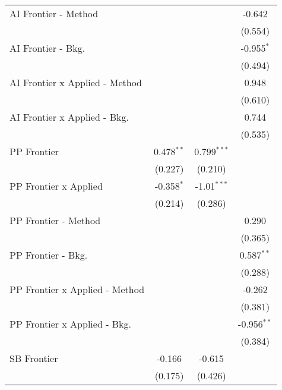\begin{tabular}{lccc}
   AI Frontier - Method           &               &               & -0.642\\   
                                  &               &               & (0.554)\\   
   AI Frontier - Bkg.             &               &               & -0.955$^{*}$\\   
                                  &               &               & (0.494)\\   
   AI Frontier x Applied - Method &               &               & 0.948\\   
                                  &               &               & (0.610)\\   
   AI Frontier x Applied - Bkg.   &               &               & 0.744\\   
                                  &               &               & (0.535)\\   
   PP Frontier                    & 0.478$^{**}$  & 0.799$^{***}$ &   \\   
                                  & (0.227)       & (0.210)       &   \\   
   PP Frontier x Applied          & -0.358$^{*}$  & -1.01$^{***}$ &   \\   
                                  & (0.214)       & (0.286)       &   \\   
   PP Frontier - Method           &               &               & 0.290\\   
                                  &               &               & (0.365)\\   
   PP Frontier - Bkg.             &               &               & 0.587$^{**}$\\   
                                  &               &               & (0.288)\\   
   PP Frontier x Applied - Method &               &               & -0.262\\   
                                  &               &               & (0.381)\\   
   PP Frontier x Applied - Bkg.   &               &               & -0.956$^{**}$\\   
                                  &               &               & (0.384)\\   
   SB Frontier                    & -0.166        & -0.615        &   \\   
                                  & (0.175)       & (0.426)       &   \\   

\end{tabular}
